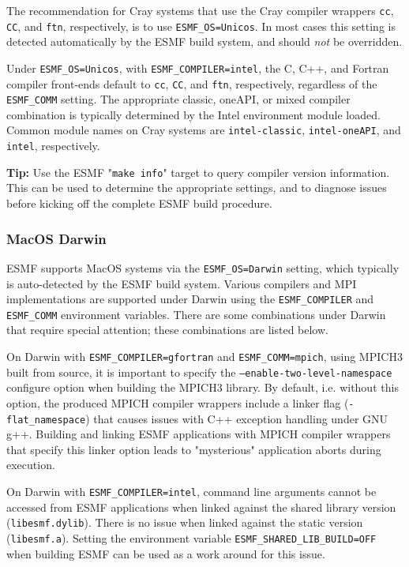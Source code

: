 The recommendation for Cray systems that use the Cray compiler wrappers {\tt cc}, {\tt CC}, and {\tt ftn},
respectively, is to use {\tt ESMF\_OS=Unicos}. In most cases this setting is detected automatically by the ESMF
build system, and should {\em not} be overridden.

Under {\tt ESMF\_OS=Unicos}, with {\tt ESMF\_COMPILER=intel}, the C, C++, and Fortran compiler front-ends default to
{\tt cc}, {\tt CC}, and {\tt ftn}, respectively, regardless of the  {\tt ESMF\_COMM} setting. The appropriate
classic, oneAPI, or mixed compiler combination is typically determined by the Intel environment module loaded.
Common module names on Cray systems are {\tt intel-classic}, {\tt intel-oneAPI}, and {\tt intel}, respectively.

{\bf Tip: } Use the ESMF "{\tt make info}" target to query compiler version information. This can be used to determine the
appropriate settings, and to diagnose issues before kicking off the complete ESMF build procedure.

\subsubsection{MacOS Darwin}

ESMF supports MacOS systems via the {\tt ESMF\_OS=Darwin} setting, which
typically is auto-detected by the ESMF build system. Various compilers and
MPI implementations are supported under Darwin using the {\tt ESMF\_COMPILER}
and {\tt ESMF\_COMM} environment variables. There are some combinations under
Darwin that require special attention; these combinations are listed below.

On Darwin with {\tt ESMF\_COMPILER=gfortran} and {\tt ESMF\_COMM=mpich},
using MPICH3 built from source, it is important to specify the
{\tt --enable-two-level-namespace} configure option when building the MPICH3
library. By default, i.e. without this option, the produced MPICH compiler
wrappers include a linker flag ({\tt -flat\_namespace}) that causes issues with
C++ exception handling under GNU g++. Building and linking ESMF applications
with MPICH compiler wrappers that specify this linker option leads to
"mysterious" application aborts during execution.

On Darwin with {\tt ESMF\_COMPILER=intel}, command line arguments cannot be
accessed from ESMF applications when linked against the shared library version
({\tt libesmf.dylib}). There is no issue when linked against the static
version ({\tt libesmf.a}). Setting the environment variable
{\tt ESMF\_SHARED\_LIB\_BUILD=OFF} when building ESMF can be used as a
work around for this issue.

